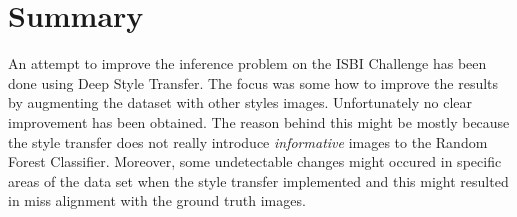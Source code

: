 \documentclass[12pt, a4paper]{scrartcl}
\begin{document}
\section{Summary }

An attempt to improve the inference problem on the ISBI Challenge has been done using Deep Style Transfer. The focus was some how to improve the results by augmenting the dataset with other styles images. Unfortunately no clear improvement  has been obtained. The reason behind this might be mostly because the style transfer does not really introduce \emph{informative} images to the Random Forest Classifier. Moreover, some undetectable changes might occured in specific areas of the data set when the style transfer implemented and this might resulted in miss alignment with the ground truth images.
\label{sec:sum}



\end{document}
